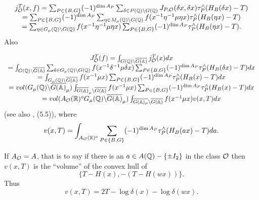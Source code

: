 \begin{equation}
\begin{array}{c}
j_{\cal{O}}^T(x,f)
=\sum_{P\in \{B,G\}}(-1)^{\dim A_P}
\sum_{\delta \in P( {\Bbb{Q}})\backslash G({\Bbb{Q}})}
J_{P,{\cal{O}}}(\delta x,\delta x) \tau _P^{\wedge}(H_B(\delta x)-T) \\ 
=\sum_{P\in \{B,G\}}(-1)^{\dim A_P}
\sum_{\eta \in M_\mu ( {\Bbb{Q}})\backslash G({\Bbb{Q}})}
f(x^{-1}\eta ^{-1}\mu \eta x)\tau _P^{\wedge}(H_B(\eta x)-T) \\ 
=\sum_{\eta \in G_\mu ({\Bbb{Q}})\backslash G({\Bbb{Q}} )}
f(x^{-1}\eta ^{-1}\mu\eta x)
\sum_{P\in \{B,G\}}(-1)^{\dim A_P} \tau_P^{\wedge }(H_B(\eta x)-T).
\end{array}
\end{equation}
Also

\begin{equation}
\begin{array}{c}
J_{\cal{O}}^T(f)
=\int_{G({\Bbb{Q}})\backslash
\overline{G({\Bbb{A}})}}
j_{\cal{O}}^T(x)dx \\ 
=\int_{G({\Bbb{Q}})\backslash \overline{G({\Bbb{A}})}}
\sum_{\delta \in G_\mu ({\Bbb{Q}})\backslash G({\Bbb{Q}})}
f(x^{-1}\delta ^{-1}\mu \delta x)
\sum_{P\in\{B,G\}}(-1)^{\dim A_P}\tau _P^{\wedge }(H_B(\delta x)-T)dx \\ 
=\int_{G_\mu ({\Bbb{Q}})\backslash \overline{G({\Bbb{A}})}}
f(x^{-1}\mu x)\sum_{P\in\{B,G\}}(-1)^{\dim A_P}
\tau _P^{\wedge }(H_B(x)-T)dx \\ 
=vol(G_\mu ({\Bbb{Q}})\backslash \overline{G({\Bbb{A}})}_\mu)
\int_{\overline{G({\Bbb{A}})}_\mu\backslash \overline{G({\Bbb{A}})}}
f(x^{-1}\mu x)\sum_{P\in \{B,G\}}(-1)^{\dim A_P}
\tau_P^{\wedge }(H_B(x)-T)dx \\ 
=vol(A_{\cal{O}}({\Bbb{R}})^oG_\mu ({\Bbb{Q}})\backslash
\overline{G ({\Bbb{A}})}_\mu)
\int_{\overline{G ({\Bbb{A}})_\mu}\backslash \overline{G({\Bbb{A}})}}
f(x^{-1}\mu x)v(x,T)dx
\end{array}
\end{equation}
(see also \cite{Sho}, (5.5)), where 
\begin{equation}
v(x,T)=\int_{A_{\cal{O}}({\Bbb{R}})^o}
\sum_{P\in \{B,G\}}(-1)^{\dim A_P}\tau_P^{\wedge }(H_B(ax)-T)da.
\end{equation}

If $A_{\cal{O}}=A$, that is to say if there is an
$a\in A({\Bbb{Q}})-\{\pm I_2\}$ in the class ${\cal{O}}$
then $v(x,T)$ is the ``volume'' of the convex hull of 
\[
\{T-H(x),-(T-H(wx))\}. 
\]
Thus 
\begin{equation}
v(x,T)=2T-\log \delta(x)-\log \delta(wx).
\end{equation}

